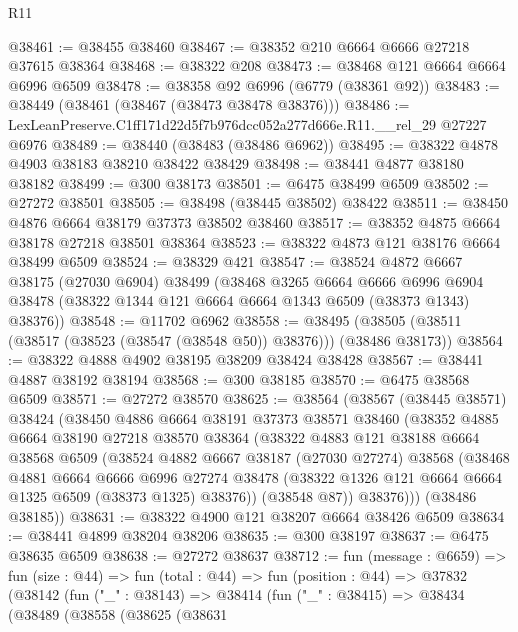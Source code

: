\begin{lexlean}{R11}
\begin{coremodule}
@38461 := @38455 @38460
@38467 := @38352 @210 @6664 @6666 @27218 @37615 @38364
@38468 := @38322 @208
@38473 := @38468 @121 @6664 @6664 @6996 @6509
@38478 := @38358 @92 @6996 (@6779 (@38361 @92))
@38483 := @38449 (@38461 (@38467 (@38473 @38478 @38376)))
@38486 := LexLeanPreserve.C1ff171d22d5f7b976dcc052a277d666e.R11.__rel_29 @27227 @6976
@38489 := @38440 (@38483 (@38486 @6962))
@38495 := @38322 @4878 @4903 @38183 @38210 @38422 @38429
@38498 := @38441 @4877 @38180 @38182
@38499 := @300 @38173
@38501 := @6475 @38499 @6509
@38502 := @27272 @38501
@38505 := @38498 (@38445 @38502) @38422
@38511 := @38450 @4876 @6664 @38179 @37373 @38502 @38460
@38517 := @38352 @4875 @6664 @38178 @27218 @38501 @38364
@38523 := @38322 @4873 @121 @38176 @6664 @38499 @6509
@38524 := @38329 @421
@38547 := @38524
    @4872
    @6667
    @38175
    (@27030 @6904)
    @38499
    (@38468
      @3265
      @6664
      @6666
      @6996
      @6904
      @38478
      (@38322 @1344 @121 @6664 @6664 @1343 @6509 (@38373 @1343) @38376))
@38548 := @11702 @6962
@38558 := @38495 (@38505 (@38511 (@38517 (@38523 (@38547 (@38548 @50)) @38376))) (@38486 @38173))
@38564 := @38322 @4888 @4902 @38195 @38209 @38424 @38428
@38567 := @38441 @4887 @38192 @38194
@38568 := @300 @38185
@38570 := @6475 @38568 @6509
@38571 := @27272 @38570
@38625 := @38564
    (@38567
      (@38445 @38571)
      @38424
      (@38450
        @4886
        @6664
        @38191
        @37373
        @38571
        @38460
        (@38352
          @4885
          @6664
          @38190
          @27218
          @38570
          @38364
          (@38322
            @4883
            @121
            @38188
            @6664
            @38568
            @6509
            (@38524
              @4882
              @6667
              @38187
              (@27030 @27274)
              @38568
              (@38468
                @4881
                @6664
                @6666
                @6996
                @27274
                @38478
                (@38322 @1326 @121 @6664 @6664 @1325 @6509 (@38373 @1325) @38376))
              (@38548 @87))
            @38376)))
      (@38486 @38185))
@38631 := @38322 @4900 @121 @38207 @6664 @38426 @6509
@38634 := @38441 @4899 @38204 @38206
@38635 := @300 @38197
@38637 := @6475 @38635 @6509
@38638 := @27272 @38637
@38712 := fun (message : @6659) =>
  fun (size : @44) =>
  fun (total : @44) =>
  fun (position : @44) =>
  @37832
    (@38142
      (fun ("_" : @38143) =>
      @38414
        (fun ("_" : @38415) =>
        @38434
          (@38489
            (@38558
              (@38625
                (@38631

\end{coremodule}
\end{lexlean}
